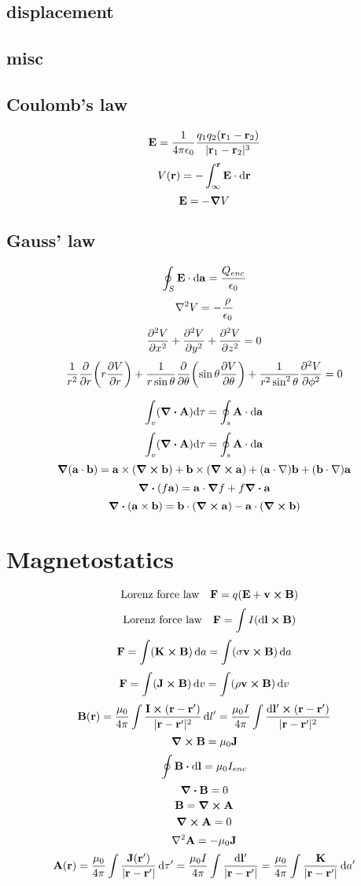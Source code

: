 \documentclass[12pt]{article}
\begin{document}
\subsection*{displacement}
\subsection*{misc}
\subsection*{Coulomb's law}
\[\vb{E}=\frac{1}{4\pi\epsilon_0}\frac{q_1q_2(\vb{r}_1-\vb{r}_2)}{|\vb{r}_1-\vb{r}_2|^3}\]
\[V(\vb{r})=-\int_\infty^{\vb{r}}\vb{E}\cdot\dd\vb{r}\]
\[\vb{E}=-\grad{V}\]
\subsection*{Gauss' law}
\[\oint_S{\vb{E}\cdot\dd{\vb{a}}}=\frac{Q_{enc}}{\epsilon_0}\]
\[\laplacian{V}=-\frac{\rho}{\epsilon_0}\]
\[\pdv[2]{V}{x}+\pdv[2]{V}{y}+\pdv[2]{V}{z}=0\]
\[\frac{1}{r^2}\pdv{r}\qty(r\pdv{V}{r})+\frac{1}{r\sin\theta}\pdv{\theta}\qty(\sin\theta\pdv{V}{\theta})+\frac{1}{r^2\sin^2\theta}\pdv[2]{V}{\phi}=0\]

\[\int_{v}(\div{\vb{A}})\dd\tau=\oint_{s}\vb{A}\cdot\dd{\vb{a}}\]
\[\int_{v}(\div{\vb{A}})\dd\tau=\oint_{s}\vb{A}\cdot\dd{\vb{a}}\]
\[\grad{(\vb{a}\cdot\vb{b})}=\vb{a}\times(\curl{\vb{b}})+\vb{b}\times(\curl{\vb{a}})+(\vb{a}\cdot\nabla)\vb{b}+(\vb{b}\cdot\nabla)\vb{a}\]
\[\div{(f\vb{a})}=\vb{a}\cdot\grad{f}+f\div{\vb{a}}\]
\[\div{(\vb{a}\times\vb{b})}=\vb{b}\cdot(\curl{\vb{a}})-\vb{a}\cdot(\curl{\vb{b}})\]
\section{Magnetostatics}
\[\qq{Lorenz force law}\vb{F}=q(\vb{E}+\vb{v}\cp\vb{B})\]
\[\qq{Lorenz force law}\vb{F}=\int I(\dd\vb{l}\cp\vb{B})\]
\[\vb{F}=\int (\vb{K}\cp\vb{B})\dd{a}=\int (\sigma\vb{v}\cp\vb{B})\dd{a}\]
\[\vb{F}=\int (\vb{J}\cp\vb{B})\dd{v}=\int (\rho\vb{v}\cp\vb{B})\dd{v}\]
\[\vb{B}(\vb{r})=\frac{\mu_0}{4\pi}\int\frac{\vb{I}\cp(\vb{r}-\vb{r}')}{|\vb{r}-\vb{r}'|^2}\dd{l'}=\frac{\mu_0I}{4\pi}\int\frac{\dd\vb{l'}\cp(\vb{r}-\vb{r}')}{|\vb{r}-\vb{r}'|^2}\]
\[\curl{\vb{B}}=\mu_0\vb{J}\]
\[\oint\vb{B}\vdot\dd{\vb{l}}=\mu_0I_{enc}\]
\[\div{\vb{B}}=0\]
\[\vb{B}=\curl{\vb{A}}\]
\[\curl{\vb{A}}=0\]
\[\laplacian{\vb{A}}=-\mu_0\vb{J}\]
\[\vb{A(\vb{r})}=\frac{\mu_0}{4\pi}\int\frac{\vb{J(\vb{r'})}}{|\vb{r}-\vb{r'}|}\dd{\tau'}=\frac{\mu_0I}{4\pi}\int\frac{\dd{\vb{l}'}}{|\vb{r}-\vb{r'}|}=\frac{\mu_0}{4\pi}\int\frac{\vb{K}}{|\vb{r}-\vb{r'}|}\dd{a'}\]
\end{document}
